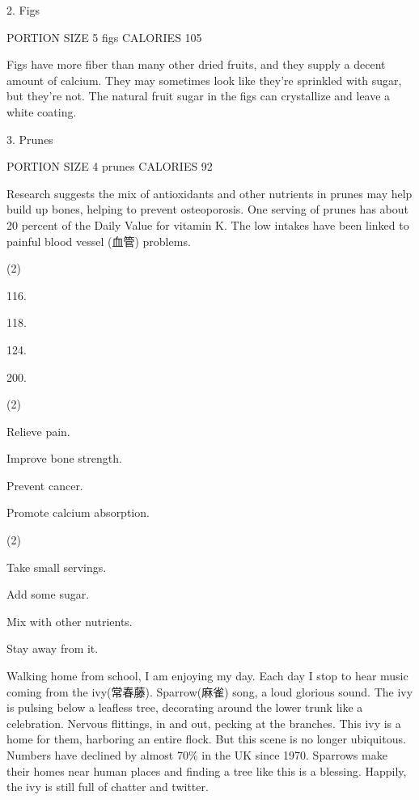 \documentclass{英语试卷}
\begin{document}
\par 2. Figs\par
\par PORTION SIZE 5 figs CALORIES 105\par
\par Figs have more fiber than many other dried fruits, and they supply a decent amount of calcium. They may sometimes look like they're sprinkled with sugar, but they're not. The natural fruit sugar in the figs can crystallize and leave a white coating.\par
\par 3. Prunes\par
\par PORTION SIZE 4 prunes CALORIES 92\par
\par Research suggests the mix of antioxidants and other nutrients in prunes may help build up bones, helping to prevent osteoporosis. One serving of prunes has about 20 percent of the Daily Value for vitamin K. The low intakes have been linked to painful blood vessel (血管) problems.\par
{}
\begin{choices}(2)
  \item 116.
  \item 118.
  \item 124.
  \item 200.
\end{choices}
\begin{choices}(2)
  \item Relieve pain.
  \item Improve bone strength.
  \item Prevent cancer.
  \item Promote calcium absorption.
\end{choices}
\begin{choices}(2)
  \item Take small servings.
  \item Add some sugar.
  \item Mix with other nutrients.
  \item Stay away from it.
\end{choices}
\par Walking home from school, I am enjoying my day. Each day I stop to hear music coming from the ivy(常春藤). Sparrow(麻雀) song, a loud glorious sound. The ivy is pulsing below a leafless tree, decorating around the lower trunk like a celebration. Nervous flittings, in and out, pecking at the branches. This ivy is a home for them, harboring an entire flock. But this scene is no longer ubiquitous. Numbers have declined by almost 70\% in the UK since 1970. Sparrows make their homes near human places and finding a tree like this is a blessing. Happily, the ivy is still full of chatter and twitter.\par
\end{document}
